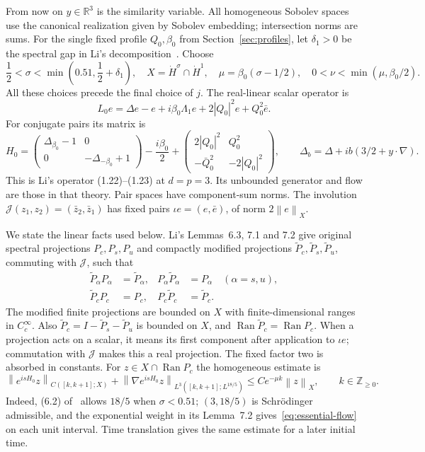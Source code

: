 \documentclass[11pt]{article}
\numberwithin{equation}{section}
\theoremstyle{remark}
\newcommand{\R}{\mathbb R}
\newcommand{\norm}[1]{\left\|#1\right\|}
\newcommand{\dH}{\dot H}
\newcommand{\Lam}[1]{\Lambda_{#1}}
\newcommand{\Pt}[1]{\widetilde P_{#1}}
\DeclareMathOperator{\Ran}{Ran}
\begin{document}
From now on $y\in\R^3$ is the similarity variable. All homogeneous
Sobolev spaces use the canonical realization given by Sobolev embedding;
intersection norms are sums. For the single fixed profile $Q_0,\beta_0$
from Section~\ref{sec:profiles}, let $\delta_1>0$ be the spectral gap
in Li's decomposition~\cite[Lemma 6.3]{Li}. Choose
\begin{equation}\label{eq:sigma-nu}
 \frac12<\sigma<\min\left(0.51,\frac12+\delta_1\right),
 \quad X=\dH^\sigma\cap\dH^1,\quad
 \mu=\beta_0(\sigma-1/2),\quad
 0<\nu<\min(\mu,\beta_0/2).
\end{equation}
All these choices precede the final choice of $j$.
The real-linear scalar operator is
\[
 L_0e=\Delta e-e+i\beta_0\Lam1 e+2|Q_0|^2e+Q_0^2\bar e.
\]
For conjugate pairs its matrix is
\begin{equation}\label{eq:H0}
 H_0=
 \begin{pmatrix}\Delta_{\beta_0}-1&0\\0&-\Delta_{-\beta_0}+1\end{pmatrix}
 -\frac{i\beta_0}{2}
 +\begin{pmatrix}2|Q_0|^2&Q_0^2\\-\bar Q_0^2&-2|Q_0|^2\end{pmatrix},
 \qquad \Delta_b=\Delta+ib(3/2+y\cdot\nabla).
\end{equation}
This is Li's operator (1.22)--(1.23) at $d=p=3$.
Its unbounded generator and flow are those in that theory.
Pair spaces have component-sum norms. The involution
$\mathcal J(z_1,z_2)=(\bar z_2,\bar z_1)$ has fixed pairs
$\iota e=(e,\bar e)$, of norm $2\norm e_X$.

We state the linear facts used below. Li's Lemmas~6.3, 7.1 and 7.2 give
original spectral projections $P_c,P_s,P_u$ and compactly modified
projections $\Pt c,\Pt s,\Pt u$, commuting with $\mathcal J$, such that
\begin{align}
 \Pt\alpha P_\alpha&=\Pt\alpha,&
 P_\alpha\Pt\alpha&=P_\alpha\quad(\alpha=s,u),\label{eq:finite-projections}\\
 \Pt cP_c&=P_c,&P_c\Pt c&=\Pt c.
 \label{eq:central-projections}
\end{align}
The modified finite projections are bounded on $X$ with finite-dimensional
ranges in $C_c^\infty$. Also $\Pt c=I-\Pt s-\Pt u$ is bounded on $X$,
and $\Ran\Pt c=\Ran P_c$.
When a projection acts on a scalar, it means its first component after
application to $\iota e$; commutation with $\mathcal J$ makes this a
real projection. The fixed factor two is absorbed in constants.
For $z\in X\cap\Ran P_c$ the homogeneous estimate is
\begin{equation}\label{eq:essential-flow}
 \norm{e^{isH_0}z}_{C([k,k+1];X)}
 +\norm{\nabla e^{isH_0}z}_{L^3([k,k+1];L^{18/5})}
 \le C e^{-\mu k}\norm z_X,
 \qquad k\in\mathbb Z_{\ge0}.
\end{equation}
Indeed, (6.2) of~\cite{Li} allows $18/5$ when $\sigma<0.51$;
$(3,18/5)$ is Schr\"odinger admissible, and the exponential weight in
its Lemma~7.2 gives~\eqref{eq:essential-flow} on each unit interval.
Time translation gives the same estimate for a later initial time.
\end{document}
